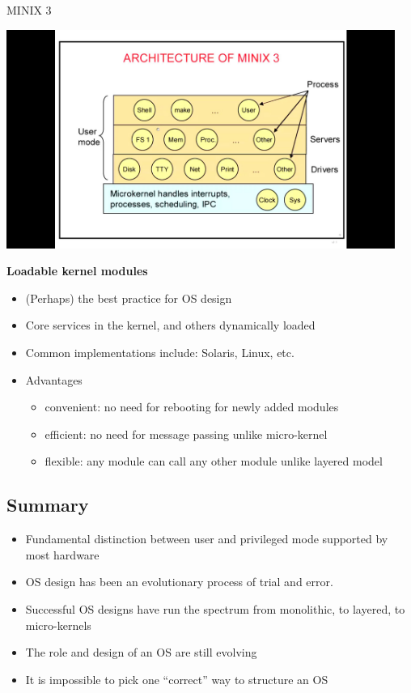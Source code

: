 \documentclass[11pt,a4paper]{article}
\begin{document}
MINIX 3

\includegraphics[height=270]{minix-3.jpg}

\textbf{Loadable kernel modules}

\begin{itemize}
    \item (Perhaps) the best practice for OS design
    \item Core services in the kernel, and others dynamically loaded
    \item Common implementations include: Solaris, Linux, etc.
    \item Advantages
        \begin{itemize}
            \item convenient: no need for rebooting for newly added modules
            \item efficient: no need for message passing unlike micro-kernel
            \item flexible: any module can call any other module unlike layered model
        \end{itemize}
\end{itemize}

\subsection{Summary}

\begin{itemize}
    \item Fundamental distinction between user and privileged mode supported by most hardware
    \item OS design has been an evolutionary process of trial and error.
    \item Successful OS designs have run the spectrum  from monolithic, to layered,
        to micro-kernels
    \item The role and design of an OS are still evolving
    \item It is impossible to pick one ``correct'' way to structure an OS
\end{itemize}
\end{document}
